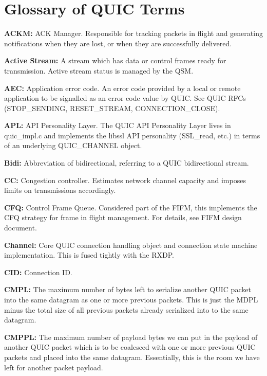 \chapter{Glossary of QUIC Terms}
\hypertarget{md__c_1_2_users_2namph_2_downloads_2openssl_2openssl-3_82_81_2doc_2designs_2quic-design_2glossary}{}\label{md__c_1_2_users_2namph_2_downloads_2openssl_2openssl-3_82_81_2doc_2designs_2quic-design_2glossary}
{\bfseries{ACKM\+:}} ACK Manager. Responsible for tracking packets in flight and generating notifications when they are lost, or when they are successfully delivered.

{\bfseries{Active Stream\+:}} A stream which has data or control frames ready for transmission. Active stream status is managed by the QSM.

{\bfseries{AEC\+:}} Application error code. An error code provided by a local or remote application to be signalled as an error code value by QUIC. See QUIC RFCs ({\ttfamily STOP\+\_\+\+SENDING}, {\ttfamily RESET\+\_\+\+STREAM}, {\ttfamily CONNECTION\+\_\+\+CLOSE}).

{\bfseries{APL\+:}} API Personality Layer. The QUIC API Personality Layer lives in {\ttfamily quic\+\_\+impl.\+c} and implements the libssl API personality ({\ttfamily SSL\+\_\+read}, etc.) in terms of an underlying {\ttfamily QUIC\+\_\+\+CHANNEL} object.

{\bfseries{Bidi\+:}} Abbreviation of bidirectional, referring to a QUIC bidirectional stream.

{\bfseries{CC\+:}} Congestion controller. Estimates network channel capacity and imposes limits on transmissions accordingly.

{\bfseries{CFQ\+:}} Control Frame Queue. Considered part of the FIFM, this implements the CFQ strategy for frame in flight management. For details, see FIFM design document.

{\bfseries{Channel\+:}} Core QUIC connection handling object and connection state machine implementation. This is fused tightly with the RXDP.

{\bfseries{CID\+:}} Connection ID.

{\bfseries{CMPL\+:}} The maximum number of bytes left to serialize another QUIC packet into the same datagram as one or more previous packets. This is just the MDPL minus the total size of all previous packets already serialized into to the same datagram.

{\bfseries{CMPPL\+:}} The maximum number of payload bytes we can put in the payload of another QUIC packet which is to be coalesced with one or more previous QUIC packets and placed into the same datagram. Essentially, this is the room we have left for another packet payload.

